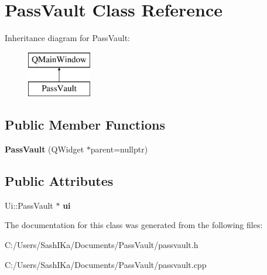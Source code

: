 \hypertarget{class_pass_vault}{}\section{Pass\+Vault Class Reference}
\label{class_pass_vault}
Inheritance diagram for Pass\+Vault\+:\begin{figure}[H]
\begin{center}
\leavevmode
\includegraphics[height=2.000000cm]{class_pass_vault}
\end{center}
\end{figure}
\subsection*{Public Member Functions}
\begin{DoxyCompactItemize}
\item 
\mbox{\label{class_pass_vault_afeafbefa1a0870f74423aa0343408f1a}} 
{\bfseries Pass\+Vault} (Q\+Widget $\ast$parent=nullptr)
\end{DoxyCompactItemize}
\subsection*{Public Attributes}
\begin{DoxyCompactItemize}
\item 
\mbox{\label{class_pass_vault_a4cbd95f5a790790dfed096d13951f1fa}} 
Ui\+::\+Pass\+Vault $\ast$ {\bfseries ui}
\end{DoxyCompactItemize}


The documentation for this class was generated from the following files\+:\begin{DoxyCompactItemize}
\item 
C\+:/\+Users/\+Sash\+I\+Ka/\+Documents/\+Pass\+Vault/passvault.\+h\item 
C\+:/\+Users/\+Sash\+I\+Ka/\+Documents/\+Pass\+Vault/passvault.\+cpp\end{DoxyCompactItemize}
